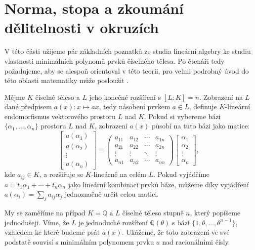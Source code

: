 \documentclass[12pt]{report}
\begin{document}
\section{Norma, stopa a zkoumání dělitelnosti v okruzích}

V této části užijeme pár základních poznatků ze studia lineární algebry ke studiu vlastnosti minimálních polynomů prvků číselného tělesa. Po čtenáři tedy požadujeme, aby se alespoň  orientoval v této teorii, pro velmi podrobný úvod do této oblasti matematiky může posloužit \cite{Johnson}.

Mějme $K$ číselné těleso a $L$ jeho konečné rozšíření s $[L:K] = n$. Zobrazení na $L$ dané předpisem $a(x) : x \mapsto ax$, tedy násobení prvkem $a \in L$, definuje $K$-lineární endomorfismus vektorového prostoru $L$ nad $K$. Pokud si vybereme bázi $\lbrace \alpha_1,\dots,\alpha_n \rbrace$ prostoru $L$ nad $K$, zobrazení $a(x)$ působí na tuto bázi jako matice:
\begin{equation*}
\begin{bmatrix}
a(\alpha_1) \\
a(\alpha_2) \\
\vdots\\
a(\alpha_n)
\end{bmatrix} = \begin{pmatrix}
a_{11} & a_{12} & \cdots & a_{1n}\\
a_{21} & a_{22} & \cdots & a_{2n}\\
\vdots & \vdots & \ddots &\vdots\\
a_{n1} & a_{n2} & \cdots& a_{nn}
\end{pmatrix} \begin{bmatrix}
\alpha_1 \\
\alpha_2 \\
\vdots\\
\alpha_n
\end{bmatrix},
\end{equation*}
kde $a_{ij} \in K$, a rozšiřuje se $K$-lineárně na celém $L$. Pokud vyjádříme $a = t_1 \alpha_1 + \cdots + t_n \alpha_n$ jako lineární kombinaci prvků báze, můžeme díky vyjádření $a(\alpha_i) = \sum_j a_{ij} \alpha_{j}$ jednoznačně určit celou matici.

My se zaměříme na případ $K=\mathbb{Q}$ a $L$ číselné těleso stupně $n$, který popíšeme jednodušeji. Víme, že $L$ je jednoduché rozšíření $\mathbb{Q}(\theta)$ s bází $\lbrace 1,\theta,\dots,\theta^{n-1} \rbrace$, vzhledem ke které budeme psát $a(x)$. Ukážeme, že toto zobrazení ve své podstatě souvisí s minimálním polynomem prvku $a$ nad racionálními čísly.
\end{document}
